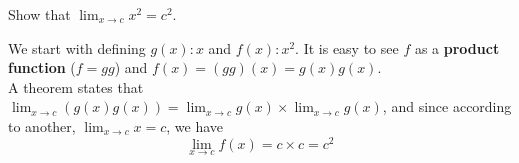 \documentclass[boxes, qed]{homework}
\begin{document}
\begin{problem}Show that $\lim_{x\rightarrow{c}}{x^2}=c^2$.
\end{problem}
\begin{solution}We start with defining $g(x):x$ and $f(x):x^2$.
  It is easy to see $f$ as a \textbf{product function} ($f=gg$)
  and $f(x)=(gg)(x)=g(x)g(x)$.\\
  A theorem states that $\lim_{x\rightarrow{c}}{(g(x)g(x))}
  =\lim_{x\rightarrow{c}}{g(x)} \times \lim_{x\rightarrow{c}}{g(x)}$,
  and since according to another, $\lim_{x\rightarrow{c}}{x}=c$,
  we have
  $$\lim_{x\rightarrow{c}}{f(x)}=c\times{c}=c^2$$
\end{solution}
\end{document}
